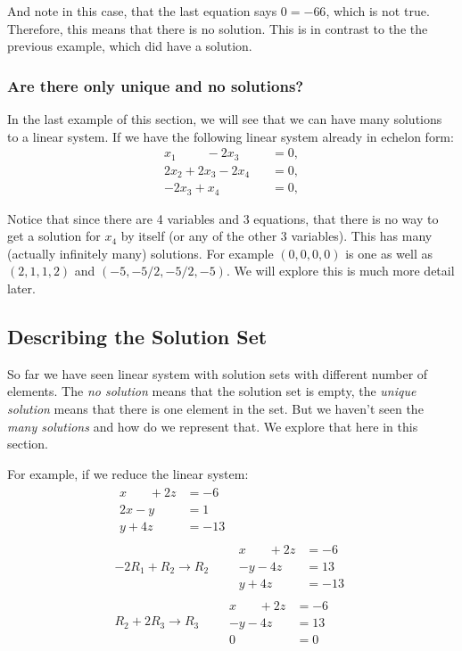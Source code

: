 And note in this case, that the last equation says $0=-66$, which is not true.  Therefore, this means that there is no solution.  This is in contrast to the the previous example, which did have a solution.  


\subsubsection{Are there only unique and no solutions?}

In the last example of this section, we will see that we can have many solutions to a linear system.  If we have the following linear system already in echelon form:
%
\begin{align*}
x_1\phantom{+2x2} -2x_3\phantom{+x_4} & = 0, \\
2x_2 +2x_3 -2x_4 & = 0, \\
-2x_3 + x_4 & = 0, 
\end{align*}

Notice that since there are 4 variables and 3 equations, that there is no way to get a solution for $x_4$ by itself (or any of the other 3 variables).  This has many (actually infinitely many) solutions.  For example $(0,0,0,0)$ is one as well as $(2,1,1,2)$ and $(-5,-5/2,-5/2,-5)$.  We will explore this is much more detail later.  

\subsection{Describing the Solution Set}

So far we have seen linear system with solution sets with different number of elements.  The \emph{no solution} means that the solution set is empty, the \emph{unique solution} means that there is one element in the set.  But we haven't seen the \emph{many solutions} and how do we represent that.  We explore that here in this section. 

For example, if we reduce the linear system: \label{ex:many:solutions}
%
\begin{align*}
\begin{split}
x\phantom{+2y} + 2z & = -6 \\
2x-y\phantom{+3z}& = 1 \\
y+4z& = -13
\end{split} \\[12pt]
-2R_1+R_2 \rightarrow R_2 \qquad
\begin{split}
x\phantom{+2y} + 2z & = -6 \\
-y-4z& = 13 \\
y+4z& = -13
\end{split} \\[12pt]
R_2 + 2R_3 \rightarrow R_3 \qquad
\begin{split}
x\phantom{+2y} + 2z & = -6 \\
-y -4z & = 13 \\
0 & = 0 
\end{split} \\[12pt]
\end{align*}

